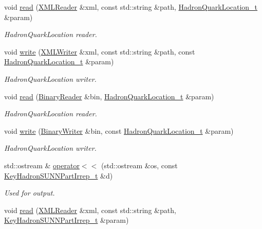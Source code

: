 \begin{DoxyCompactItemize}
void \mbox{\hyperlink{namespaceHadron_a48b9ff1049a4c339c032065b538ed41f}{read}} (\mbox{\hyperlink{classADATXML_1_1XMLReader}{X\+M\+L\+Reader}} \&xml, const std\+::string \&path, \mbox{\hyperlink{structHadron_1_1HadronQuarkLocation__t}{Hadron\+Quark\+Location\+\_\+t}} \&param)
\begin{DoxyCompactList}\small\item\em Hadron\+Quark\+Location reader. \end{DoxyCompactList}\item 
void \mbox{\hyperlink{namespaceHadron_a2737e3c3e39c76c6dbe81ce5e484f6cc}{write}} (\mbox{\hyperlink{classADATXML_1_1XMLWriter}{X\+M\+L\+Writer}} \&xml, const std\+::string \&path, const \mbox{\hyperlink{structHadron_1_1HadronQuarkLocation__t}{Hadron\+Quark\+Location\+\_\+t}} \&param)
\begin{DoxyCompactList}\small\item\em Hadron\+Quark\+Location writer. \end{DoxyCompactList}\item 
void \mbox{\hyperlink{namespaceHadron_a6860ee691eb6d64d0fb2d52f4977316b}{read}} (\mbox{\hyperlink{classADATIO_1_1BinaryReader}{Binary\+Reader}} \&bin, \mbox{\hyperlink{structHadron_1_1HadronQuarkLocation__t}{Hadron\+Quark\+Location\+\_\+t}} \&param)
\begin{DoxyCompactList}\small\item\em Hadron\+Quark\+Location reader. \end{DoxyCompactList}\item 
void \mbox{\hyperlink{namespaceHadron_a8953a24e53ffe4d60e9c0ba26a48a9e3}{write}} (\mbox{\hyperlink{classADATIO_1_1BinaryWriter}{Binary\+Writer}} \&bin, const \mbox{\hyperlink{structHadron_1_1HadronQuarkLocation__t}{Hadron\+Quark\+Location\+\_\+t}} \&param)
\begin{DoxyCompactList}\small\item\em Hadron\+Quark\+Location writer. \end{DoxyCompactList}\item 
std\+::ostream \& \mbox{\hyperlink{namespaceHadron_a684b751246f1b7f63d5feafa97160408}{operator$<$$<$}} (std\+::ostream \&os, const \mbox{\hyperlink{structHadron_1_1KeyHadronSUNNPartIrrep__t}{Key\+Hadron\+S\+U\+N\+N\+Part\+Irrep\+\_\+t}} \&d)
\begin{DoxyCompactList}\small\item\em Used for output. \end{DoxyCompactList}\item 
void \mbox{\hyperlink{namespaceHadron_a4cc74936761dd0dad429189f523b1432}{read}} (\mbox{\hyperlink{classADATXML_1_1XMLReader}{X\+M\+L\+Reader}} \&xml, const std\+::string \&path, \mbox{\hyperlink{structHadron_1_1KeyHadronSUNNPartIrrep__t}{Key\+Hadron\+S\+U\+N\+N\+Part\+Irrep\+\_\+t}} \&param)

\end{DoxyCompactItemize}
